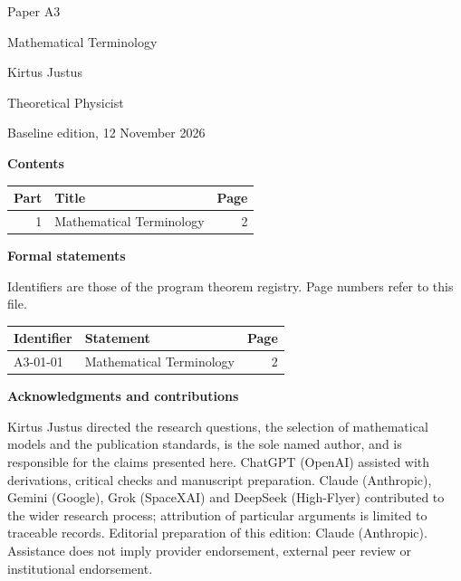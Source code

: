 \documentclass[11pt,a4paper]{article}
\begin{document}
\thispagestyle{empty}\pagestyle{empty}
{\small\sffamily \ProgramTitle\hfill Paper A3\par}
\vspace*{12mm}
{\LARGE\bfseries\raggedright{} Mathematical Terminology\par}
\vspace{9mm}
{\large Kirtus Justus\par}\vspace{1mm}Theoretical Physicist\par\AuthorLocation\par\vspace{2mm}Baseline edition, 12 November 2026\par\vspace{8mm}
\textbf{Contents}\par\vspace{1mm}
{\small\begin{longtable}{@{}r>{\raggedright\arraybackslash}p{}r@{}}
\toprule Part & Title & Page\\\midrule\endhead
1 & Mathematical Terminology & 2\\
\bottomrule\end{longtable}}
\vspace{2mm}\textbf{Formal statements}\par\vspace{1mm}
{\footnotesize Identifiers are those of the program theorem registry. Page numbers refer to this file.\par}
{\footnotesize\begin{longtable}{@{}l>{\raggedright\arraybackslash}p{}r@{}}
\toprule Identifier & Statement & Page\\\midrule\endhead
A3-01-01 & Mathematical Terminology & 2\\
\bottomrule\end{longtable}}
\vspace{3mm}\textbf{Acknowledgments and contributions}\par
{\small Kirtus Justus directed the research questions, the selection of mathematical models and the publication standards, is the sole named author, and is responsible for the claims presented here. ChatGPT (OpenAI) assisted with derivations, critical checks and manuscript preparation. Claude (Anthropic), Gemini (Google), Grok (SpaceXAI) and DeepSeek (High-Flyer) contributed to the wider research process; attribution of particular arguments is limited to traceable records. Editorial preparation of this edition: Claude (Anthropic). Assistance does not imply provider endorsement, external peer review or institutional endorsement.\par}
\end{document}
